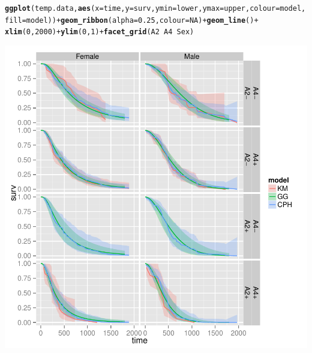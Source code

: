 \documentclass{article}\usepackage[]{graphicx}\usepackage[]{color}
\makeatletter
\def\maxwidth{ %
  \ifdim\Gin@nat@width>\linewidth
    \linewidth
  \else
    \Gin@nat@width
  \fi
}
\newcommand{\hlnum}[1]{\textcolor[rgb]{0.686,0.059,0.569}{#1}}%
\newcommand{\hlopt}[1]{\textcolor[rgb]{0,0,0}{#1}}%
\newcommand{\hlstd}[1]{\textcolor[rgb]{0.345,0.345,0.345}{#1}}%
\newcommand{\hlkwc}[1]{\textcolor[rgb]{0.333,0.667,0.333}{#1}}%
\newcommand{\hlkwd}[1]{\textcolor[rgb]{0.737,0.353,0.396}{\textbf{#1}}}%
\newenvironment{kframe}{%
 \def\at@end@of@kframe{}%
 \ifinner\ifhmode%
  \def\at@end@of@kframe{\end{minipage}}%
  \begin{minipage}{\columnwidth}%
 \fi\fi%
 \def\FrameCommand##1{\hskip\@totalleftmargin \hskip-\fboxsep
 \colorbox{shadecolor}{##1}\hskip-\fboxsep
     \hskip-\linewidth \hskip-\@totalleftmargin \hskip\columnwidth}%
 \MakeFramed {\advance\hsize-\width
   \@totalleftmargin\z@ \linewidth\hsize
   \@setminipage}}%
 {\par\unskip\endMakeFramed%
 \at@end@of@kframe}
\newenvironment{knitrout}{}{} %
\makeatother
\begin{document}
\begin{knitrout}
{}


\begin{kframe}\begin{alltt}
\hlkwd{ggplot}\hlstd{(temp.data,} \hlkwd{aes}\hlstd{(}\hlkwc{x} \hlstd{= time,} \hlkwc{y} \hlstd{= surv,} \hlkwc{ymin} \hlstd{= lower,} \hlkwc{ymax} \hlstd{= upper,} \hlkwc{colour} \hlstd{= model,}
    \hlkwc{fill} \hlstd{= model))} \hlopt{+} \hlkwd{geom_ribbon}\hlstd{(}\hlkwc{alpha} \hlstd{=} \hlnum{0.25}\hlstd{,} \hlkwc{colour} \hlstd{=} \hlnum{NA}\hlstd{)} \hlopt{+} \hlkwd{geom_line}\hlstd{()} \hlopt{+}
    \hlkwd{xlim}\hlstd{(}\hlnum{0}\hlstd{,} \hlnum{2000}\hlstd{)} \hlopt{+} \hlkwd{ylim}\hlstd{(}\hlnum{0}\hlstd{,} \hlnum{1}\hlstd{)} \hlopt{+} \hlkwd{facet_grid}\hlstd{(A2} \hlopt{~} \hlstd{A4} \hlopt{~} \hlstd{Sex)}
\end{alltt}


{\ttfamily\noindent\color{warningcolor}{\#\# Warning: Removed 3 rows containing missing values (geom\_path).}}

{\ttfamily\noindent\color{warningcolor}{\#\# Warning: Removed 3 rows containing missing values (geom\_path).}}

{\ttfamily\noindent\color{warningcolor}{\#\# Warning: Removed 2 rows containing missing values (geom\_path).}}

{\ttfamily\noindent\color{warningcolor}{\#\# Warning: Removed 2 rows containing missing values (geom\_path).}}\end{kframe}

{\centering \includegraphics[width=\maxwidth]{figure/final-fit-assessment-2} 

}



\end{knitrout}
\end{document}
